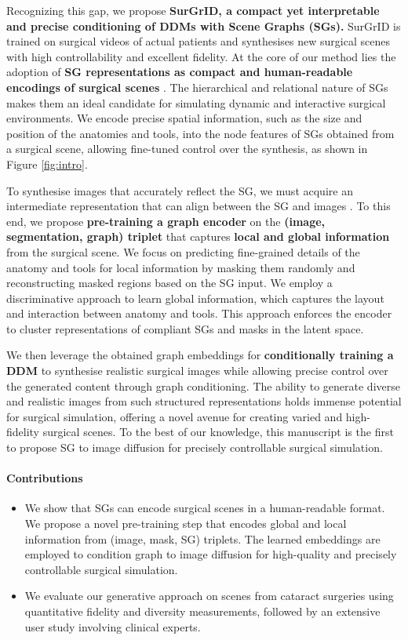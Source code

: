 Recognizing this gap, we propose \textbf{SurGrID, a compact yet interpretable and precise conditioning of DDMs with Scene Graphs (SGs).} SurGrID is trained on surgical videos of actual patients and synthesises new surgical scenes with high controllability and excellent fidelity. At the core of our method lies the adoption of \textbf{SG representations as compact and human-readable encodings of surgical scenes} \cite{holm2023dynamic, murali2023latent, koksal2024sangria}. The hierarchical and relational nature of SGs makes them an ideal candidate for simulating dynamic and interactive surgical environments. We encode precise spatial information, such as the size and position of the anatomies and tools, into the node features of SGs obtained from a surgical scene, allowing fine-tuned control over the synthesis, as shown in Figure \ref{fig:intro}.

To synthesise images that accurately reflect the SG, we must acquire an intermediate representation that can align between the SG and images \cite{yang2022diffusion, mishra2024scene}. To this end, we propose \textbf{pre-training a graph encoder} on the \textbf{(image, segmentation, graph) triplet} that captures \textbf{local and global information} from the surgical scene. We focus on predicting fine-grained details of the anatomy and tools for local information by masking them randomly and reconstructing masked regions based on the SG input. We employ a discriminative approach to learn global information, which captures the layout and interaction between anatomy and tools. This approach enforces the encoder to cluster representations of compliant SGs and masks in the latent space.

We then leverage the obtained graph embeddings for \textbf{conditionally training a DDM} \cite{ho2020denoising} to synthesise realistic surgical images while allowing precise control over the generated content through graph conditioning. The ability to generate diverse and realistic images from such structured representations holds immense potential for surgical simulation, offering a novel avenue for creating varied and high-fidelity surgical scenes. To the best of our knowledge, this manuscript is the first to propose SG to image diffusion for precisely controllable surgical simulation.

\paragraph{Contributions}
\begin{itemize}
    \item We show that SGs can encode surgical scenes in a human-readable format. We propose a novel pre-training step that encodes global and local information from (image, mask, SG) triplets. The learned embeddings are employed to condition graph to image diffusion for high-quality and precisely controllable surgical simulation.
    
    \item We evaluate our generative approach on scenes from cataract surgeries using quantitative fidelity and diversity measurements, followed by an extensive user study involving clinical experts.
\end{itemize}

